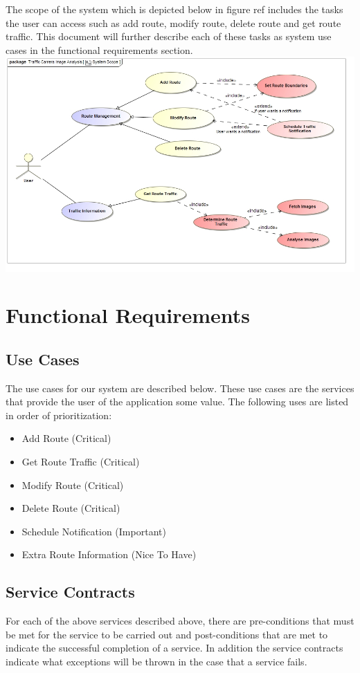 \documentclass[a4paper,12pt]{article}
\begin{document}
The scope of the system which is depicted below in {figure ref} includes the tasks the user can access such as add route, modify route, delete route and get route traffic. This document will further describe each of these tasks as system use cases in the functional requirements section.
\includegraphics[width=\textwidth]{images/System_Scope.jpg}

\section{Functional Requirements}
\subsection{Use Cases}
The use cases for our system are described below. These use cases are the services that provide the user of the application some value. The following uses are listed in order of prioritization:
\begin{itemize}
\item Add Route 			(Critical)
\item Get Route Traffic		(Critical)
\item Modify Route			(Critical)
\item Delete Route			(Critical)
\item Schedule Notification (Important)
\item Extra Route Information 	(Nice To Have)
\end{itemize}
\subsection{Service Contracts}
For each of the above services described above, there are pre-conditions that must be met for the service to be carried out and post-conditions that are met to indicate the successful completion of a service. In addition the service contracts indicate what exceptions will be thrown in the case that a service fails.
\end{document}
